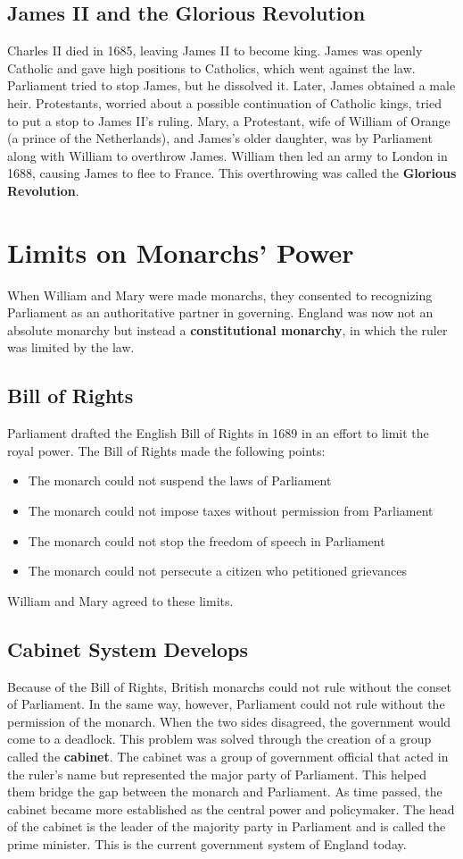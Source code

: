 \documentclass[11pt]{article}
\begin{document}
\subsection{James II and the Glorious Revolution}
\label{sec:org8fcb8c9}
Charles II died in 1685, leaving James II to become king. James was openly Catholic and gave high positions to Catholics, which went against the law. Parliament tried to stop James, but he dissolved it. Later, James obtained a male heir. Protestants, worried about a possible continuation of Catholic kings, tried to put a stop to James II's ruling. Mary, a Protestant, wife of William of Orange (a prince of the Netherlands), and James's older daughter, was by Parliament along with William to overthrow James. William then led an army to London in 1688, causing James to flee to France. This overthrowing was called the \textbf{Glorious Revolution}.
\section{Limits on Monarchs' Power}
\label{sec:org08c2e1f}
When William and Mary were made monarchs, they consented to recognizing Parliament as an authoritative partner in governing. England was now not an absolute monarchy but instead a \textbf{constitutional monarchy}, in which the ruler was limited by the law.
\subsection{Bill of Rights}
\label{sec:org1c5a387}
Parliament drafted the English Bill of Rights in 1689 in an effort to limit the royal power. The Bill of Rights made the following points:
\begin{itemize}
\item The monarch could not suspend the laws of Parliament
\item The monarch could not impose taxes without permission from Parliament
\item The monarch could not stop the freedom of speech in Parliament
\item The monarch could not persecute a citizen who petitioned grievances
\end{itemize}
William and Mary agreed to these limits.
\subsection{Cabinet System Develops}
\label{sec:org81f2a5d}
Because of the Bill of Rights, British monarchs could not rule without the conset of Parliament. In the same way, however, Parliament could not rule without the permission of the monarch. When the two sides disagreed, the government would come to a deadlock. This problem was solved through the creation of a group called the \textbf{cabinet}. The cabinet was a group of government official that acted in the ruler's name but represented the major party of Parliament. This helped them bridge the gap between the monarch and Parliament. As time passed, the cabinet became more established as the central power and policymaker. The head of the cabinet is the leader of the majority party in Parliament and is called the prime minister. This is the current government system of England today.
\end{document}
